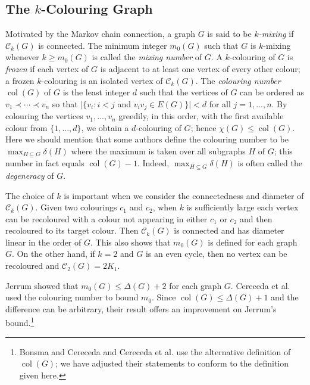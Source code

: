 \documentclass[12pt]{article}%
\begin{document}
\subsection{The $k$-Colouring Graph}

\label{Sec_k_colour}

Motivated by the Markov chain connection, a graph $G$ is said to be
$k$\emph{-mixing} if $\mathcal{C}_{k}(G)$ is connected. The minimum integer
$m_{0}(G)$ such that $G$ is $k$-mixing whenever $k\geq m_{0}(G)$ is called the
\emph{mixing number} of $G$. A $k$-colouring of $G$ is \emph{frozen} if each
vertex of $G$ is adjacent to at least one vertex of every other colour; a
frozen $k$-colouring is an isolated vertex of $\mathcal{C}_{k}(G)$. The
\emph{colouring number} $\operatorname{col}(G)$ of $G$ is the least integer
$d$ such that the vertices of $G$ can be ordered as $v_{1}\prec\cdots\prec
v_{n}$ so that $|\{v_{i}:i<j$ and $v_{i}v_{j}\in E(G)\}|<d$ for all
$j=1,...,n$. By colouring the vertices $v_{1},...,v_{n}$ greedily, in this
order, with the first available colour from $\{1,...,d\}$, we obtain a
$d$-colouring of $G$; hence $\chi(G)\leq\operatorname{col}(G)$. Here we should
mention that some authors define the colouring number to be $\max_{H\subseteq
G}\delta(H)$ where the maximum is taken over all subgraphs $H$ of $G$; this
number in fact equals $\operatorname{col}(G)-1$. Indeed, $\max_{H\subseteq
G}\delta(H)$ is often called the \emph{degeneracy} of $G$.



The choice of $k$ is important when we consider the connectedness and diameter
of $\mathcal{C}_{k}(G)$. Given two colourings $c_{1}$ and $c_{2}$, when $k$ is
sufficiently large each vertex can be recoloured with a colour not appearing
in either $c_{1}$ or $c_{2}$ and then recoloured to its target colour. Then
$\mathcal{C}_{k}(G)$ is connected and has diameter linear in the order of $G$.
This also shows that $m_{0}(G)$ is defined for each graph $G$. On the other
hand, if $k=2$ and $G$ is an even cycle, then no vertex can be recoloured and
$\mathcal{C}_{2}(G)=2K_{1}$.

Jerrum \cite{26CM-Jerrum} showed that $m_{0}(G)\leq\Delta(G)+2$ for each graph
$G$. Cereceda et al. \cite{26CM-CHJ1} used the colouring number to bound
$m_{0}$. Since $\operatorname{col}(G)\leq\Delta(G)+1$ and the difference can
be arbitrary, their result offers an improvement on Jerrum's
bound.\footnote{Bonsma and Cereceda \cite{26CM-BC} and Cereceda et al.
\cite{26CM-CHJ1} use the alternative definition of $\operatorname{col}(G)$; we
have adjusted their statements to conform to the definition given here.}
\end{document}
